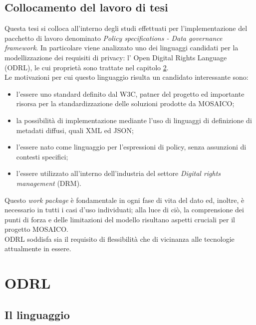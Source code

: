 \documentclass[12pt,a4paper,twoside]{book}
\begin{document}
\section{Collocamento del lavoro di tesi}
Questa tesi si colloca all'interno degli studi effettuati per l'implementazione del pacchetto di lavoro denominato \textit{Policy specifications - Data governance framework}. In particolare viene analizzato uno dei linguaggi candidati per la modellizzazione dei requisiti di privacy: l' Open Digital Rights Language (ODRL), le cui proprietà sono trattate nel capitolo \ref{ODRLChapter}.\\
Le motivazioni per cui questo linguaggio risulta un candidato interessante sono:
\begin{itemize}
\item l'essere uno standard definito dal W3C, patner del progetto ed importante risorsa per la standardizzazione delle soluzioni prodotte da MOSAICO;
\item la possibilità di implementazione mediante l'uso di linguaggi di definizione di metadati diffusi, quali XML ed JSON;
\item l'essere nato come linguaggio per l'espressioni di policy, senza assunzioni di contesti specifici;
\item l'essere utilizzato all'interno dell'industria del settore \textit{Digital rights management} (DRM).
\end{itemize}
Questo \textit{work package} è fondamentale in ogni fase di vita del dato ed, inoltre, è necessario in tutti i casi d'uso individuati; alla luce di ciò, la comprensione dei punti di forza e delle limitazioni del modello risultano aspetti cruciali per il progetto MOSAICO. \\
ODRL soddisfa sia il requisito di flessibilità che di vicinanza alle tecnologie attualmente in essere.
\chapter{ODRL}\label{ODRLChapter} 
\section{Il linguaggio}
\end{document}
